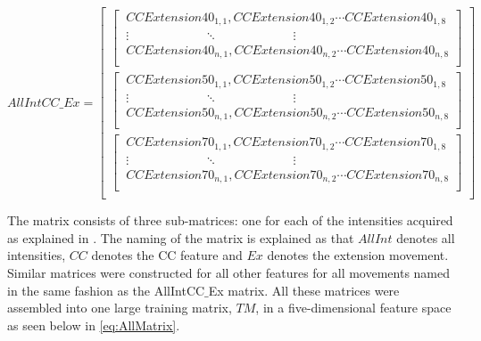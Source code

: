 \begin{equation} \label{eq:CCMatrix}
AllIntCC\_Ex=\begin{bmatrix} 
\begin{bmatrix}
\ CCExtension40_{1,1}, CCExtension40_{1,2} \cdots CCExtension40_{1,8} \\ 
\ \vdots \qquad \qquad \qquad \ddots \qquad \qquad \qquad \vdots \\
\ CCExtension40_{n,1}, CCExtension40_{n,2}  \cdots CCExtension40_{n,8} \\ \end{bmatrix} \\
\begin{bmatrix} 
\ CCExtension50_{1,1}, CCExtension50_{1,2} \cdots CCExtension50_{1,8} \\
\ \vdots \qquad \qquad \qquad \ddots \qquad \qquad \qquad \vdots \\
\ CCExtension50_{n,1}, CCExtension50_{n,2} \cdots CCExtension50_{n,8} \\ \end{bmatrix} \\
\begin{bmatrix} 
\ CCExtension70_{1,1}, CCExtension70_{1,2} \cdots CCExtension70_{1,8} \\
\ \vdots \qquad \qquad \qquad \ddots \qquad \qquad \qquad \vdots \\
\ CCExtension70_{n,1}, CCExtension70_{n,2} \cdots CCExtension70_{n,8} \\ \end{bmatrix} \\
\end{bmatrix}
\end{equation}

The matrix consists of three sub-matrices: one for each of the intensities acquired as explained in . The naming of the matrix is explained as that $AllInt$ denotes all intensities, $CC$ denotes the CC feature and $Ex$ denotes the extension movement. Similar matrices were constructed for all other features for all movements named in the same fashion as the AllIntCC$\_$Ex matrix. All these matrices were assembled into one large training matrix, $TM$, in a five-dimensional feature space as seen below in \eqref{eq:AllMatrix}. 

